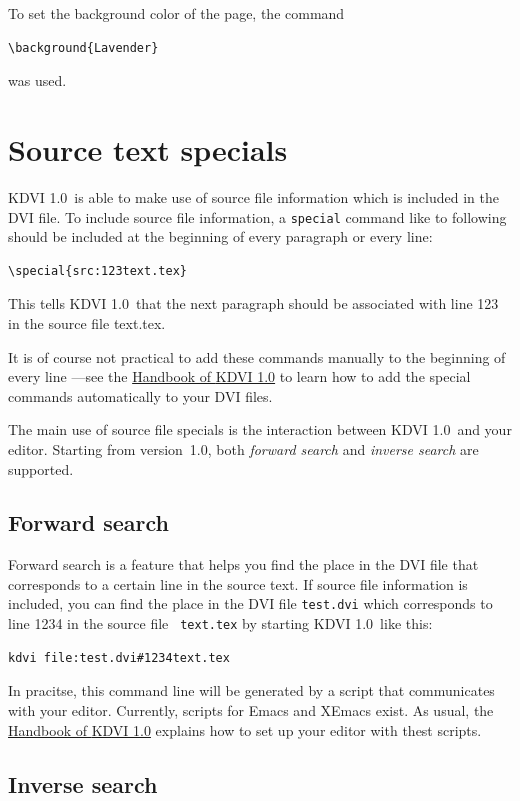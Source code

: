 \documentclass{article}
\newcommand{\KDVI}{{\sf KDVI 1.0}}
\begin{document}
To set the background color of the page, the command
\begin{verbatim}
\background{Lavender}
\end{verbatim}
was used.


\section{Source text specials}

\KDVI\ is able to make use of source file information which is included
in the DVI file. To include source file information, a {\tt special}
command like to following should be included at the beginning of every
paragraph or every line:
\begin{verbatim}
\special{src:123text.tex}
\end{verbatim}
This tells \KDVI\ that the next paragraph should be associated with
line 123 in the source file text.tex.

It is of course not practical to add these commands manually to the
beginning of every line ---see the \href{help:/kdvi}{Handbook of
\KDVI} to learn how to add the special commands automatically to your
DVI files.

The main use of source file specials is the interaction between \KDVI\
and your editor. Starting from version~1.0, both \emph{forward search}
and \emph{inverse search} are supported.

\subsection{Forward search}

Forward search is a feature that helps you find the place in the DVI
file that corresponds to a certain line in the source text. If source
file information is included, you can find the place in the DVI file
{\tt test.dvi} which corresponds to line 1234 in the source file {\tt
text.tex} by starting \KDVI\ like this:
\begin{verbatim}
kdvi file:test.dvi#1234text.tex
\end{verbatim}
In pracitse, this command line will be generated by a script that
communicates with your editor. Currently, scripts for Emacs and XEmacs
exist. As usual, the \href{help:/kdvi/forward-search.html}{Handbook of
\KDVI} explains how to set up your editor with thest scripts.


\subsection{Inverse search}
\end{document}
